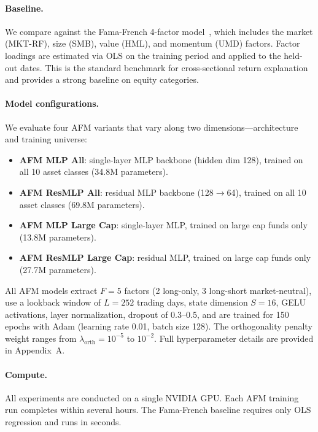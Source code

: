 \paragraph{Baseline.}
We compare against the Fama-French 4-factor model~\citep{Carhart1997persistence, FamaFrench2015fivefactor}, which includes the market (MKT-RF), size (SMB), value (HML), and momentum (UMD) factors. Factor loadings are estimated via OLS on the training period and applied to the held-out dates. This is the standard benchmark for cross-sectional return explanation and provides a strong baseline on equity categories.

\paragraph{Model configurations.}
We evaluate four AFM variants that vary along two dimensions---architecture and training universe:
\begin{itemize}[leftmargin=*,itemsep=2pt]
    \item \textbf{AFM MLP All}: single-layer MLP backbone (hidden dim 128), trained on all 10 asset classes (34.8M parameters).
    \item \textbf{AFM ResMLP All}: residual MLP backbone (128$\to$64), trained on all 10 asset classes (69.8M parameters).
    \item \textbf{AFM MLP Large Cap}: single-layer MLP, trained on large cap funds only (13.8M parameters).
    \item \textbf{AFM ResMLP Large Cap}: residual MLP, trained on large cap funds only (27.7M parameters).
\end{itemize}
All AFM models extract $F=5$ factors (2 long-only, 3 long-short market-neutral), use a lookback window of $L=252$ trading days, state dimension $S=16$, GELU activations, layer normalization, dropout of 0.3--0.5, and are trained for 150 epochs with Adam (learning rate 0.01, batch size 128). The orthogonality penalty weight ranges from $\lambda_{\text{orth}} = 10^{-5}$ to $10^{-2}$. Full hyperparameter details are provided in Appendix~A.

\paragraph{Compute.}
All experiments are conducted on a single NVIDIA GPU. Each AFM training run completes within several hours. The Fama-French baseline requires only OLS regression and runs in seconds.

